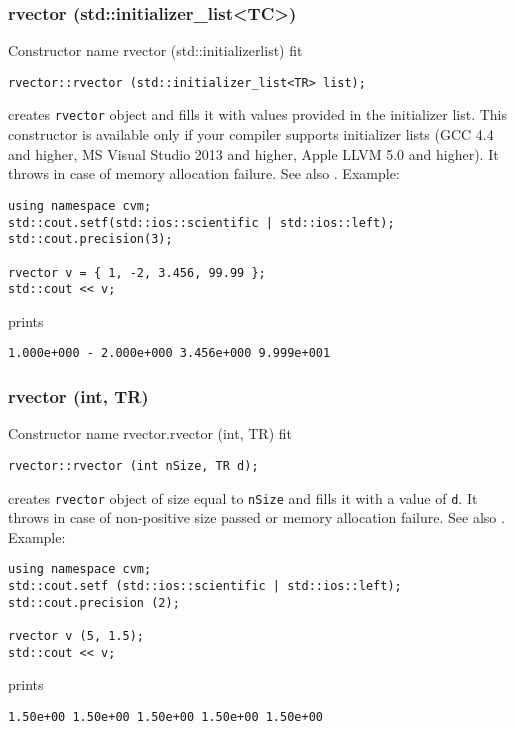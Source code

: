 \subsubsection{rvector (std::initializer\_list<TC>)}
Constructor%
\pdfdest name {rvector (std::initializerlist)} fit
\begin{verbatim}
rvector::rvector (std::initializer_list<TR> list);
\end{verbatim}
creates \verb"rvector" object and fills it with values provided in the initializer list.
This constructor is available only if your compiler supports initializer lists
(GCC 4.4 and higher, MS Visual Studio 2013 and higher, Apple LLVM 5.0 and higher).
It throws  
in case of memory allocation failure.
See also .
Example:
\begin{Verbatim}
using namespace cvm;
std::cout.setf(std::ios::scientific | std::ios::left);
std::cout.precision(3);

rvector v = { 1, -2, 3.456, 99.99 };
std::cout << v;
\end{Verbatim}
prints
\begin{Verbatim}
1.000e+000 - 2.000e+000 3.456e+000 9.999e+001
\end{Verbatim}
\newpage




\subsubsection{rvector (int, TR)}
Constructor%
\pdfdest name {rvector.rvector (int, TR)} fit
\begin{verbatim}
rvector::rvector (int nSize, TR d);
\end{verbatim}
creates \verb"rvector" object of size equal to \verb"nSize"
and fills it with a value of \verb"d".
It throws  
in case of non-positive size passed or memory allocation failure.
See also .
Example:
\begin{Verbatim}
using namespace cvm;
std::cout.setf (std::ios::scientific | std::ios::left); 
std::cout.precision (2);

rvector v (5, 1.5);
std::cout << v;
\end{Verbatim}
prints
\begin{Verbatim}
1.50e+00 1.50e+00 1.50e+00 1.50e+00 1.50e+00
\end{Verbatim}
\newpage



